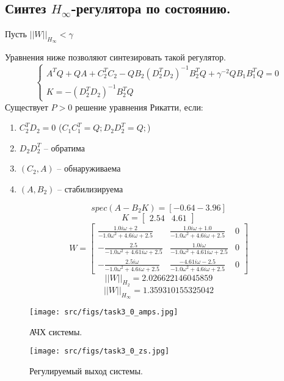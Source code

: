 \subsection{Синтез \(H_\infty\)-регулятора по состоянию.}
Пусть \(||W||_{H_\infty} < \gamma\)

Уравнения ниже позволяют синтезировать такой регулятор.
\begin{equation}
    \begin{cases}
        A^TQ + QA +C_2^TC_2 - QB_2(D_2^TD_2)^{-1}B_2^TQ + \gamma^{-2}QB_1B_1^TQ=0 \\
        K = -(D_2^TD_2)^{-1}B_2^TQ
    \end{cases}
\end{equation}
Существует \(P > 0\) решение уравнения Рикатти, если:
\begin{enumerate}
  \item \(C_2^TD_2 = 0\) (\(C_1C_1^T = Q; D_2D_2^T = Q;\))
  \item \(D_2D_2^T\) -- обратима
  \item \((C_2, A)\) -- обнаруживаема
  \item \((A, B_2)\) -- стабилизируема
\end{enumerate}


\[spec(A-B_2 K) = [-0.64 -3.96]\]
\[K = \begin{bmatrix}
  2.54 &  4.61
\end{bmatrix}\]
\[W = \left[\begin{matrix}\frac{1.0 i \omega + 2}{- 1.0 \omega^{2} + 4.6 i \omega + 2.5} & \frac{1.0 i \omega + 1.0}{- 1.0 \omega^{2} + 4.6 i \omega + 2.5} & 0\\- \frac{2.5}{- 1.0 \omega^{2} + 4.61 i \omega + 2.5} & \frac{1.0 i \omega}{- 1.0 \omega^{2} + 4.61 i \omega + 2.5} & 0\\- \frac{2.5 i \omega}{- 1.0 \omega^{2} + 4.6 i \omega + 2.5} & \frac{- 4.61 i \omega - 2.5}{- 1.0 \omega^{2} + 4.6 i \omega + 2.5} & 0\end{matrix}\right]\]
\[||W||_{H_2} = 2.026622146045859\]
\[||W||_{H_\infty} = 1.359310155325042 \]

\begin{figure}[ht!]
    \centering
    \texttt{[image: src/figs/task3\_0\_amps.jpg]}
    \caption{АЧХ системы.}
    \label{fig:task3_0_amps}
  \end{figure}
  
  \begin{figure}[ht!]
    \centering
    \texttt{[image: src/figs/task3\_0\_zs.jpg]}
    \caption{Регулируемый выход системы.}
    \label{fig:task3_0_zs}
  \end{figure}
  
